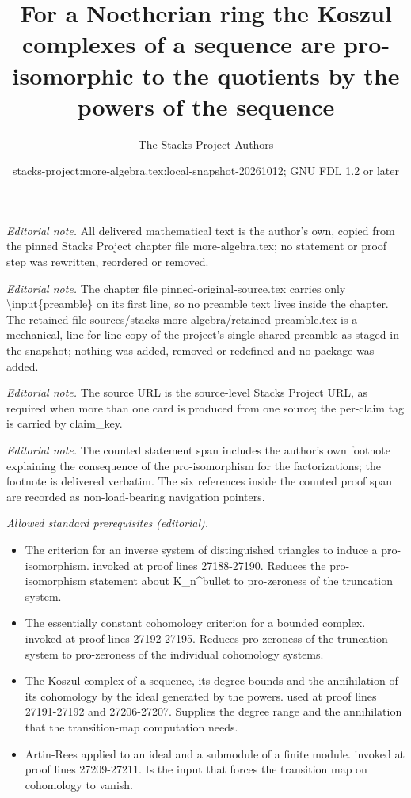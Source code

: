 \documentclass[10pt,a4paper]{amsart}
\title{For a Noetherian ring the Koszul complexes of a sequence are pro-isomorphic to the quotients by the powers of the sequence}
\author{The Stacks Project Authors}
\date{stacks-project:more-algebra.tex:local-snapshot-20261012; GNU FDL 1.2 or later}
\theoremstyle{plain}
\theoremstyle{definition}
\theoremstyle{remark}
\numberwithin{equation}{subsection}
\begin{document}
\maketitle
\setcounter{subsection}{1}
\noindent\textit{Editorial note.} All delivered mathematical text is the author's own, copied from the pinned Stacks Project chapter file more-algebra.tex; no statement or proof step was rewritten, reordered or removed.\par\medskip
\noindent\textit{Editorial note.} The chapter file pinned-original-source.tex carries only \textbackslash{}input\{preamble\} on its first line, so no preamble text lives inside the chapter. The retained file sources/stacks-more-algebra/retained-preamble.tex is a mechanical, line-for-line copy of the project's single shared preamble as staged in the snapshot; nothing was added, removed or redefined and no package was added.\par\medskip
\noindent\textit{Editorial note.} The source URL is the source-level Stacks Project URL, as required when more than one card is produced from one source; the per-claim tag is carried by claim\_key.\par\medskip
\noindent\textit{Editorial note.} The counted statement span includes the author's own footnote explaining the consequence of the pro-isomorphism for the factorizations; the footnote is delivered verbatim. The six references inside the counted proof span are recorded as non-load-bearing navigation pointers.\par\medskip
\noindent\textit{Allowed standard prerequisites (editorial).}\begin{itemize}
\item The criterion for an inverse system of distinguished triangles to induce a pro-isomorphism. invoked at proof lines 27188-27190. Reduces the pro-isomorphism statement about K\_n\textasciicircum{}bullet to pro-zeroness of the truncation system.
\item The essentially constant cohomology criterion for a bounded complex. invoked at proof lines 27192-27195. Reduces pro-zeroness of the truncation system to pro-zeroness of the individual cohomology systems.
\item The Koszul complex of a sequence, its degree bounds and the annihilation of its cohomology by the ideal generated by the powers. used at proof lines 27191-27192 and 27206-27207. Supplies the degree range and the annihilation that the transition-map computation needs.
\item Artin-Rees applied to an ideal and a submodule of a finite module. invoked at proof lines 27209-27211. Is the input that forces the transition map on cohomology to vanish.
\end{itemize}\medskip
\end{document}
